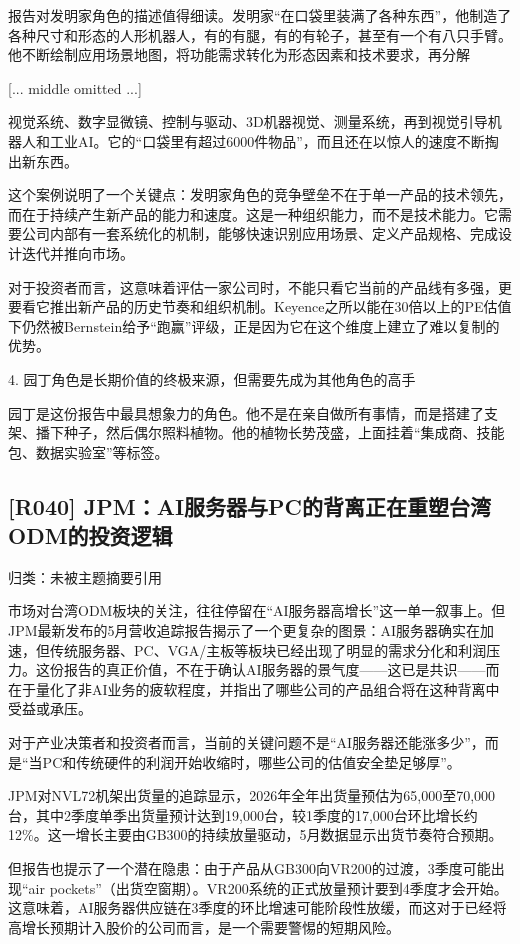 \documentclass[11pt]{ctexart}
\begin{document}
报告对发明家角色的描述值得细读。发明家“在口袋里装满了各种东西”，他制造了各种尺寸和形态的人形机器人，有的有腿，有的有轮子，甚至有一个有八只手臂。他不断绘制应用场景地图，将功能需求转化为形态因素和技术要求，再分解

[... middle omitted ...]

视觉系统、数字显微镜、控制与驱动、3D机器视觉、测量系统，再到视觉引导机器人和工业AI。它的“口袋里有超过6000件物品”，而且还在以惊人的速度不断掏出新东西。

这个案例说明了一个关键点：发明家角色的竞争壁垒不在于单一产品的技术领先，而在于持续产生新产品的能力和速度。这是一种组织能力，而不是技术能力。它需要公司内部有一套系统化的机制，能够快速识别应用场景、定义产品规格、完成设计迭代并推向市场。

对于投资者而言，这意味着评估一家公司时，不能只看它当前的产品线有多强，更要看它推出新产品的历史节奏和组织机制。Keyence之所以能在30倍以上的PE估值下仍然被Bernstein给予“跑赢”评级，正是因为它在这个维度上建立了难以复制的优势。

4. 园丁角色是长期价值的终极来源，但需要先成为其他角色的高手

园丁是这份报告中最具想象力的角色。他不是在亲自做所有事情，而是搭建了支架、播下种子，然后偶尔照料植物。他的植物长势茂盛，上面挂着“集成商、技能包、数据实验室”等标签。

\subsection{[R040] JPM：AI服务器与PC的背离正在重塑台湾ODM的投资逻辑}
{\small\color{refgray}归类：未被主题摘要引用}

市场对台湾ODM板块的关注，往往停留在“AI服务器高增长”这一单一叙事上。但JPM最新发布的5月营收追踪报告揭示了一个更复杂的图景：AI服务器确实在加速，但传统服务器、PC、VGA/主板等板块已经出现了明显的需求分化和利润压力。这份报告的真正价值，不在于确认AI服务器的景气度——这已是共识——而在于量化了非AI业务的疲软程度，并指出了哪些公司的产品组合将在这种背离中受益或承压。

对于产业决策者和投资者而言，当前的关键问题不是“AI服务器还能涨多少”，而是“当PC和传统硬件的利润开始收缩时，哪些公司的估值安全垫足够厚”。

JPM对NVL72机架出货量的追踪显示，2026年全年出货量预估为65,000至70,000台，其中2季度单季出货量预计达到19,000台，较1季度的17,000台环比增长约12\%。这一增长主要由GB300的持续放量驱动，5月数据显示出货节奏符合预期。

但报告也提示了一个潜在隐患：由于产品从GB300向VR200的过渡，3季度可能出现“air pockets”（出货空窗期）。VR200系统的正式放量预计要到4季度才会开始。这意味着，AI服务器供应链在3季度的环比增速可能阶段性放缓，而这对于已经将高增长预期计入股价的公司而言，是一个需要警惕的短期风险。
\end{document}
